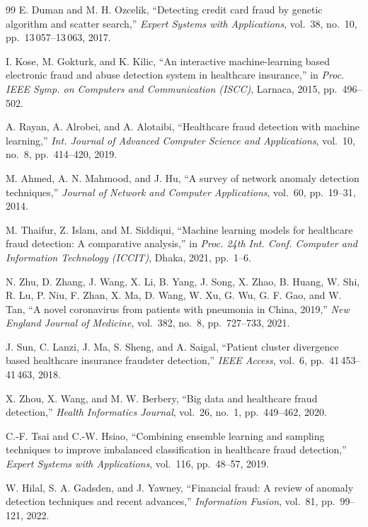 \begin{thebibliography}{99}
E. Duman and M. H. Ozcelik,
``Detecting credit card fraud by genetic algorithm and scatter search,''
\textit{Expert Systems with Applications},
vol.~38, no.~10, pp.~13\,057--13\,063, 2017.

I. Kose, M. Gokturk, and K. Kilic,
``An interactive machine-learning based electronic fraud and abuse detection system in healthcare insurance,''
in \textit{Proc. IEEE Symp. on Computers and Communication (ISCC)},
Larnaca, 2015, pp.~496--502.

A. Rayan, A. Alrobei, and A. Alotaibi,
``Healthcare fraud detection with machine learning,''
\textit{Int. Journal of Advanced Computer Science and Applications},
vol.~10, no.~8, pp.~414--420, 2019.

M. Ahmed, A. N. Mahmood, and J. Hu,
``A survey of network anomaly detection techniques,''
\textit{Journal of Network and Computer Applications},
vol.~60, pp.~19--31, 2014.

M. Thaifur, Z. Islam, and M. Siddiqui,
``Machine learning models for healthcare fraud detection: A comparative analysis,''
in \textit{Proc. 24th Int. Conf. Computer and Information Technology (ICCIT)},
Dhaka, 2021, pp.~1--6.

N. Zhu, D. Zhang, J. Wang, X. Li, B. Yang, J. Song, X. Zhao, B. Huang, W. Shi, R. Lu, P. Niu, F. Zhan, X. Ma, D. Wang, W. Xu, G. Wu, G. F. Gao, and W. Tan,
``A novel coronavirus from patients with pneumonia in China, 2019,''
\textit{New England Journal of Medicine},
vol.~382, no.~8, pp.~727--733, 2021.

J. Sun, C. Lanzi, J. Ma, S. Sheng, and A. Saigal,
``Patient cluster divergence based healthcare insurance fraudster detection,''
\textit{IEEE Access},
vol.~6, pp.~41\,453--41\,463, 2018.

X. Zhou, X. Wang, and M. W. Berbery,
``Big data and healthcare fraud detection,''
\textit{Health Informatics Journal},
vol.~26, no.~1, pp.~449--462, 2020.

C.-F. Tsai and C.-W. Hsiao,
``Combining ensemble learning and sampling techniques to improve imbalanced classification in healthcare fraud detection,''
\textit{Expert Systems with Applications},
vol.~116, pp.~48--57, 2019.

W. Hilal, S. A. Gadsden, and J. Yawney,
``Financial fraud: A review of anomaly detection techniques and recent advances,''
\textit{Information Fusion},
vol.~81, pp.~99--121, 2022.


\end{thebibliography}
